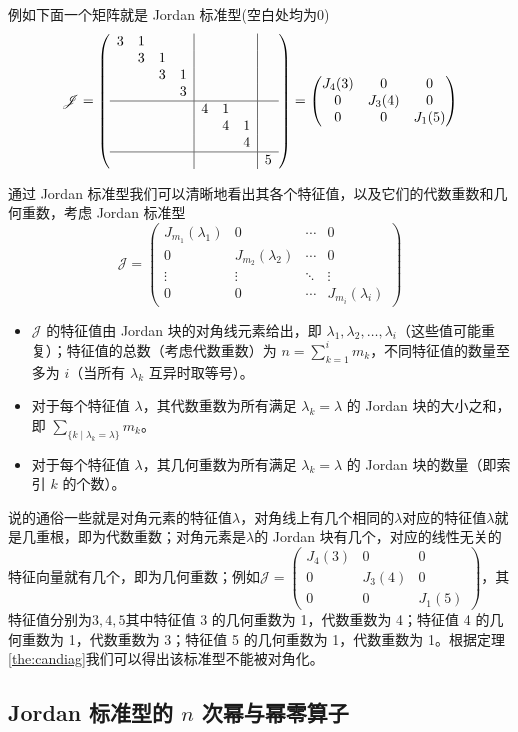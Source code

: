 例如下面一个矩阵就是 Jordan 标准型(空白处均为0)$$\mathscr{J}=\left( \begin{array}{cccc|ccc|c}
 3 & 1 &  &  &  &  &  & \\
  & 3 & 1 &  &  &  &  & \\
  &  & 3 & 1 &  &  &  & \\
  &  &  & 3 &  &  &  & \\ \hline
  &  &  &  & 4 & 1 &  & \\
  &  &  &  &  & 4 & 1 & \\
  &  &  &  &  &  & 4 & \\ \hline
  &  &  &  &  &  &  & 5
\end{array} \right)=\begin{pmatrix}
 J_4(3) & 0 &0 \\
 0 & J_3(4) &0 \\
 0 & 0 & J_1(5)
\end{pmatrix}$$

通过 Jordan 标准型我们可以清晰地看出其各个特征值，以及它们的代数重数和几何重数，考虑 Jordan 标准型 $$\mathscr{J}=\begin{pmatrix}
		J_{m_1}(\lambda_1) & 0 & \cdots & 0\\
		0 & J_{m_2}(\lambda_2) & \cdots &0 \\
		\vdots & \vdots & \ddots & \vdots\\
		0 & 0 & \cdots &J_{m_i}(\lambda_i)
		\end{pmatrix}$$
\begin{itemize}
	\item $\mathscr{J}$ 的特征值由 Jordan 块的对角线元素给出，即 $\lambda_1, \lambda_2, \ldots, \lambda_i$（这些值可能重复）；特征值的总数（考虑代数重数）为 $n = \sum_{k=1}^i m_k$，不同特征值的数量至多为 $i$（当所有 $\lambda_k$ 互异时取等号）。
	\item 对于每个特征值 $\lambda$，其代数重数为所有满足 $\lambda_k = \lambda$ 的 Jordan 块的大小之和，即 $\sum_{\{k \mid \lambda_k = \lambda\}} m_k$。
	\item 对于每个特征值 $\lambda$，其几何重数为所有满足 $\lambda_k = \lambda$ 的 Jordan 块的数量（即索引 $k$ 的个数）。
\end{itemize}
说的通俗一些就是对角元素的特征值$\lambda$，对角线上有几个相同的$\lambda$对应的特征值$\lambda$就是几重根，即为代数重数；对角元素是$\lambda$的 Jordan 块有几个，对应的线性无关的特征向量就有几个，即为几何重数；例如$\mathscr{J}=\begin{pmatrix}
 J_4(3) & 0 &0 \\
 0 & J_3(4) &0 \\
 0 & 0 & J_1(5)
\end{pmatrix}$，其特征值分别为$3,4,5$其中特征值 3 的几何重数为 1，代数重数为 4；特征值 4 的几何重数为 1，代数重数为 3；特征值 5 的几何重数为 1，代数重数为 1。根据定理\ref{the:candiag}我们可以得出该标准型不能被对角化。

\subsection{Jordan 标准型的 $n$ 次幂与幂零算子}

